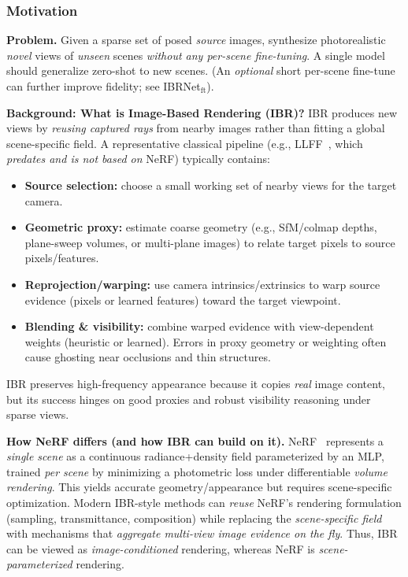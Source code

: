 \begin{enrichment}
\begin{enrichment}
     \subsubsection{Motivation}
     \label{subsec:chapter23_ibrnet_motivation}
     \textbf{Problem.} Given a sparse set of posed \emph{source} images, synthesize photorealistic \emph{novel} views of \emph{unseen} scenes \emph{without any per-scene fine-tuning}. A single model should generalize zero-shot to new scenes. (An \emph{optional} short per-scene fine-tune can further improve fidelity; see IBRNet\(_\text{ft}\)). 
     
     \textbf{Background: What is Image-Based Rendering (IBR)?}
     IBR produces new views by \emph{reusing captured rays} from nearby images rather than fitting a global scene-specific field. A representative classical pipeline (e.g., LLFF~\cite{mildenhall2019_llff}, which \emph{predates and is not based on} NeRF) typically contains:
     \begin{itemize}
         \item[(1)] \textbf{Source selection:} choose a small working set of nearby views for the target camera.
         \item[(2)] \textbf{Geometric proxy:} estimate coarse geometry (e.g., SfM/colmap depths, plane-sweep volumes, or multi-plane images) to relate target pixels to source pixels/features.
         \item[(3)] \textbf{Reprojection/warping:} use camera intrinsics/extrinsics to warp source evidence (pixels or learned features) toward the target viewpoint.
         \item[(4)] \textbf{Blending \& visibility:} combine warped evidence with view-dependent weights (heuristic or learned). Errors in proxy geometry or weighting often cause ghosting near occlusions and thin structures.
     \end{itemize}
     IBR preserves high-frequency appearance because it copies \emph{real} image content, but its success hinges on good proxies and robust visibility reasoning under sparse views.
     
     \textbf{How NeRF differs (and how IBR can build on it).}
     NeRF~\cite{mildenhall2020_nerf} represents a \emph{single scene} as a continuous radiance+density field parameterized by an MLP, trained \emph{per scene} by minimizing a photometric loss under differentiable \emph{volume rendering}. This yields accurate geometry/appearance but requires scene-specific optimization. Modern IBR-style methods can \emph{reuse} NeRF’s rendering formulation (sampling, transmittance, composition) while replacing the \emph{scene-specific field} with mechanisms that \emph{aggregate multi-view image evidence on the fly}. Thus, IBR can be viewed as \emph{image-conditioned} rendering, whereas NeRF is \emph{scene-parameterized} rendering.
     

\end{enrichment}
\end{enrichment}

